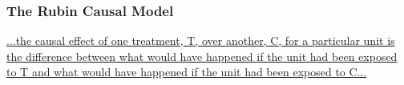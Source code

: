 \documentclass[aspectratio=169]{beamer}
\theoremstyle{principle}
\begin{document}

\begin{frame}
\frametitle{The Rubin Causal Model}

\begin{center}
\href{https://psycnet.apa.org/record/1975-06502-001}{...the \color{blue}\underline{causal effect} \color{black} of one treatment, T, over another, C, for a particular unit is the difference between what would have happened if the unit had been exposed to T and what would have happened if the unit had been exposed to C...}
\end{center}
\end{frame}
\end{document}
